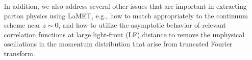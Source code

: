 In addition, we also address several other issues that are important in
extracting parton physics using LaMET, e.g., how to match appropriately to the continuum scheme near $z\sim 0$, and how to utilize the asymptotic behavior of relevant correlation functions at large light-front (LF) distance to remove the unphysical oscillations in the momentum distribution that arise from truncated Fourier transform.
